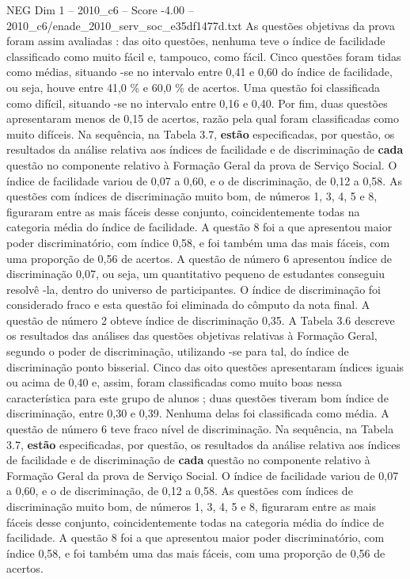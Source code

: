 \begin{textsample}{NEG Dim 1 – 2010\_c6 – Score -4.00 – 2010\_c6/enade\_2010\_serv\_soc\_e35df1477d.txt}
As questões objetivas da prova foram assim avaliadas : das oito questões, nenhuma teve o índice de facilidade classificado como muito fácil e, tampouco, como fácil.
Cinco questões foram tidas como médias, situando -se no intervalo entre 0,41 e 0,60 do índice de facilidade, ou seja, houve entre 41,0 \% e 60,0 \% de acertos.
Uma questão foi classificada como difícil, situando -se no intervalo entre 0,16 e 0,40.
Por fim, duas questões apresentaram menos de 0,15 de acertos, razão pela qual foram classificadas como muito difíceis.
Na sequência, na Tabela 3.7, \textbf{estão} especificadas, por questão, os resultados da análise relativa aos índices de facilidade e de discriminação de \textbf{cada} questão no componente relativo à Formação Geral da prova de Serviço Social.
O índice de facilidade variou de 0,07 a 0,60, e o de discriminação, de 0,12 a 0,58.
As questões com índices de discriminação muito bom, de números 1, 3, 4, 5 e 8, figuraram entre as mais fáceis desse conjunto, coincidentemente todas na categoria média do índice de facilidade.
A questão 8 foi a que apresentou maior poder discriminatório, com índice 0,58, e foi também uma das mais fáceis, com uma proporção de 0,56 de acertos.
A questão de número 6 apresentou índice de discriminação 0,07, ou seja, um quantitativo pequeno de estudantes conseguiu resolvê -la, dentro do universo de participantes.
O índice de discriminação foi considerado fraco e esta questão foi eliminada do cômputo da nota final.
A questão de número 2 obteve índice de discriminação 0,35.
A Tabela 3.6 descreve os resultados das análises das questões objetivas relativas à Formação Geral, segundo o poder de discriminação, utilizando -se para tal, do índice de discriminação ponto bisserial.
Cinco das oito questões apresentaram índices iguais ou acima de 0,40 e, assim, foram classificadas como muito boas nessa característica para este grupo de alunos ; duas questões tiveram bom índice de discriminação, entre 0,30 e 0,39.
Nenhuma delas foi classificada como média.
A questão de número 6 teve fraco nível de discriminação.
Na sequência, na Tabela 3.7, \textbf{estão} especificadas, por questão, os resultados da análise relativa aos índices de facilidade e de discriminação de \textbf{cada} questão no componente relativo à Formação Geral da prova de Serviço Social.
O índice de facilidade variou de 0,07 a 0,60, e o de discriminação, de 0,12 a 0,58.
As questões com índices de discriminação muito bom, de números 1, 3, 4, 5 e 8, figuraram entre as mais fáceis desse conjunto, coincidentemente todas na categoria média do índice de facilidade.
A questão 8 foi a que apresentou maior poder discriminatório, com índice 0,58, e foi também uma das mais fáceis, com uma proporção de 0,56 de acertos.

\end{textsample}
